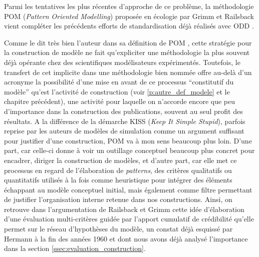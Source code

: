 Parmi les tentatives les plus récentes d'approche de ce problème, la méthodologie POM (\textit{Pattern Oriented Modelling}) \autocites{Grimm2005,Grimm2011} proposée en écologie par Grimm et Railsback vient compléter les précédents efforts de standardisation déjà réalisés avec ODD \autocite{Grimm2010}. 

Comme le dit très bien l'auteur dans sa définition de POM , cette stratégie pour la construction de modèle ne fait qu'expliciter une méthodologie la plus souvent déjà opérante chez des scientifiques modélisateurs expérimentés. Toutefois, le transfert de cet implicite dans une méthodologie bien nommée offre au-delà d'un acronyme la possibilité d'une mise en avant de ce processus \enquote{constitutif du modèle} qu'est l'activité de construction (voir \ref{p:autre_def_modele} et le chapitre précédent), une activité pour laquelle on n'accorde encore que peu d'importance dans la construction des publications, souvent au seul profit des résultats. A la différence de la démarche KISS (\textit{Keep It Simple Stupid}), parfois reprise par les auteurs de modèles de simulation comme un argument suffisant pour justifier d'une construction, POM va à mon sens beaucoup plus loin. D'une part, car celle-ci donne à voir un outillage conceptuel beaucoup plus concret pour encadrer, diriger la construction de modèles, et d'autre part, car elle met ce processus en regard de l'élaboration de \textit{patterns}, des critères qualitatifs ou quantitatifs utilisés à la fois comme heuristique pour intégrer des éléments échappant au modèle conceptuel initial, mais également comme filtre permettant de justifier l'organisation interne retenue dans nos constructions. Ainsi, on retrouve dans l'argumentation de Railsback et Grimm cette idée d'élaboration d'une évaluation multi-critères guidée par l'apport cumulatif de crédibilité qu'elle permet sur le réseau d'hypothèses du modèle, un constat déjà esquissé par Hermann à la fin des années 1960 et dont nous avons déjà analysé l'importance dans la section \ref{ssec:evaluation_construction}. 


